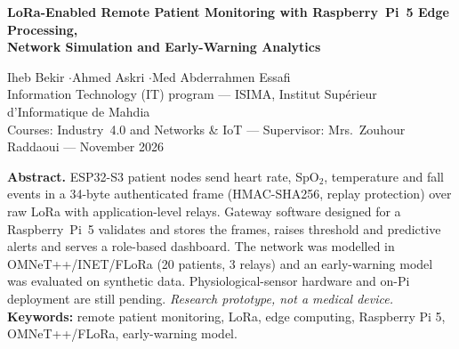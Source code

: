 \documentclass[10pt,a4paper]{article}
\begin{document}
\begin{center}
{\Large\bfseries LoRa-Enabled Remote Patient Monitoring with Raspberry~Pi~5 Edge Processing,\\ Network Simulation and Early-Warning Analytics\par}
\vspace{5pt}
{\large Iheb Bekir \quad$\cdot$\quad Ahmed Askri \quad$\cdot$\quad Med Abderrahmen Essafi}\\[1pt]
{\small Information Technology (IT) program --- ISIMA, Institut Sup\'erieur d'Informatique de Mahdia}\\[1pt]
{\small Courses: Industry~4.0 and Networks \& IoT --- Supervisor: Mrs.~Zouhour Raddaoui --- November 2026}
\end{center}
\vspace{-2pt}

\noindent\colorbox{swc!6}{\begin{minipage}{\dimexpr\textwidth-2\fboxsep}
\small\textbf{Abstract.} ESP32-S3 patient nodes send heart rate, SpO$_2$, temperature and fall events in a 34-byte authenticated frame (HMAC-SHA256, replay protection) over raw LoRa with application-level relays. Gateway software designed for a Raspberry~Pi~5 validates and stores the frames, raises threshold and predictive alerts and serves a role-based dashboard. The network was modelled in OMNeT++/INET/FLoRa (20 patients, 3 relays) and an early-warning model was evaluated on synthetic data. Physiological-sensor hardware and on-Pi deployment are still pending. \emph{Research prototype, not a medical device.}\\[2pt]
\textbf{Keywords:} remote patient monitoring, LoRa, edge computing, Raspberry Pi 5, OMNeT++/FLoRa, early-warning model.
\end{minipage}}
\end{document}

